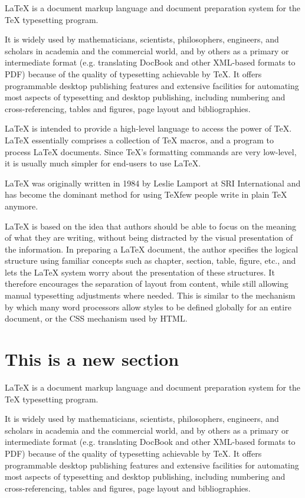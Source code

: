 
LaTeX is a document markup language and document preparation system for the TeX typesetting program.

It is widely used by mathematicians, scientists, philosophers, engineers, and scholars in academia and the commercial world, and by others as a primary or intermediate format (e.g. translating DocBook and other XML-based formats to PDF) because of the quality of typesetting achievable by TeX. It offers programmable desktop publishing features and extensive facilities for automating most aspects of typesetting and desktop publishing, including numbering and cross-referencing, tables and figures, page layout and bibliographies.

LaTeX is intended to provide a high-level language to access the power of TeX. LaTeX essentially comprises a collection of TeX macros, and a program to process LaTeX documents. Since TeX's formatting commands are very low-level, it is usually much simpler for end-users to use LaTeX.

LaTeX was originally written in 1984 by Leslie Lamport at SRI International and has become the dominant method for using TeXfew people write in plain TeX anymore.

LaTeX is based on the idea that authors should be able to focus on the meaning of what they are writing, without being distracted by the visual presentation of the information. In preparing a LaTeX document, the author specifies the logical structure using familiar concepts such as chapter, section, table, figure, etc., and lets the LaTeX system worry about the presentation of these structures. It therefore encourages the separation of layout from content, while still allowing manual typesetting adjustments where needed. This is similar to the mechanism by which many word processors allow styles to be defined globally for an entire document, or the CSS mechanism used by HTML.

\section{This is a new section}
\label{a-new-section}

LaTeX is a document markup language and document preparation system for the TeX typesetting program.

It is widely used by mathematicians, scientists, philosophers, engineers, and scholars in academia and the commercial world, and by others as a primary or intermediate format (e.g. translating DocBook and other XML-based formats to PDF) because of the quality of typesetting achievable by TeX. It offers programmable desktop publishing features and extensive facilities for automating most aspects of typesetting and desktop publishing, including numbering and cross-referencing, tables and figures, page layout and bibliographies.

